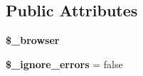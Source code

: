 \subsection*{Public Attributes}
\begin{DoxyCompactItemize}
\item 
\hypertarget{class_web_test_case_aa1fdbfbb675ddb3d811ae3bc52806ace}{
{\bfseries \$\_\-browser}}
\label{class_web_test_case_aa1fdbfbb675ddb3d811ae3bc52806ace}

\item 
\hypertarget{class_web_test_case_af93187e724ac6995526dc168af37ceeb}{
{\bfseries \$\_\-ignore\_\-errors} = false}
\label{class_web_test_case_af93187e724ac6995526dc168af37ceeb}

\end{DoxyCompactItemize}


